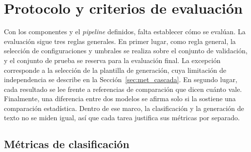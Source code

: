 
\section{Protocolo y criterios de evaluación}
\label{sec:met_protocolo}

Con los componentes y el \emph{pipeline} definidos, falta establecer cómo se evalúan. La evaluación sigue tres reglas
generales. En primer lugar, como regla general, la selección de configuraciones y umbrales se realiza sobre el conjunto de validación, y el conjunto de prueba se reserva para la evaluación final. La excepción corresponde a la selección de la plantilla de generación, cuya limitación de independencia se describe en la Sección~\ref{sec:met_cascada}. En segundo lugar, cada resultado se lee frente a referencias de
comparación que dicen cuánto vale. Finalmente, una diferencia entre dos modelos se afirma solo si la sostiene una
comparación estadística. Dentro de ese marco, la clasificación y la generación de texto no se miden igual, así que cada
tarea justifica sus métricas por separado.

\subsection{Métricas de clasificación}
\label{sec:met_seleccion}

